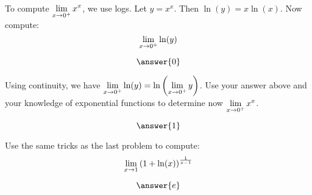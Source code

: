 \documentclass{ximera}
\begin{document}
    \begin{problem}
    To compute $\displaystyle \lim_{x \to 0^+} x^x$, we use logs. Let $y=x^x$. Then $\ln(y) = x \ln(x)$. Now compute:
    \[
        \displaystyle \lim_{x \to 0^+} \ln(y)
    \]


    $$\answer{0}$$


    Using continuity, we have $\displaystyle \lim_{x \to 0^+} \ln(y) = \ln\left(\displaystyle \lim_{x \to 0^+} y\right)$. Use your answer above and your knowledge of exponential functions to determine now $\displaystyle \lim_{x \to 0^+} x^x$.

    $$\answer{1}$$

    \end{problem}

    \begin{problem}
Use the same tricks as the last problem to compute:
        \[
            \displaystyle \lim_{x \to 1} \left(1+\ln(x)\right)^{\frac{1}{x-1}}
        \]

    $$\answer{e}$$
     \end{problem}
\end{document}
